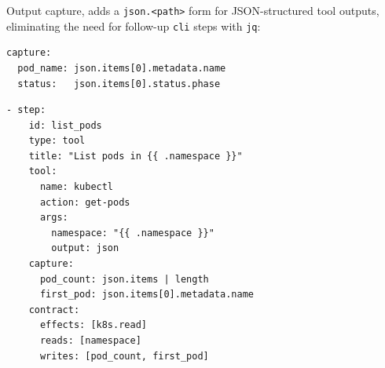 Output capture, adds a \texttt{json.<path>} form for JSON-structured tool
outputs, eliminating the need for follow-up \texttt{cli} steps with \texttt{jq}:

\begin{verbatim}
capture:
  pod_name: json.items[0].metadata.name
  status:   json.items[0].status.phase
\end{verbatim}

\begin{verbatim}
- step:
    id: list_pods
    type: tool
    title: "List pods in {{ .namespace }}"
    tool:
      name: kubectl
      action: get-pods
      args:
        namespace: "{{ .namespace }}"
        output: json
    capture:
      pod_count: json.items | length
      first_pod: json.items[0].metadata.name
    contract:
      effects: [k8s.read]
      reads: [namespace]
      writes: [pod_count, first_pod]
\end{verbatim}

